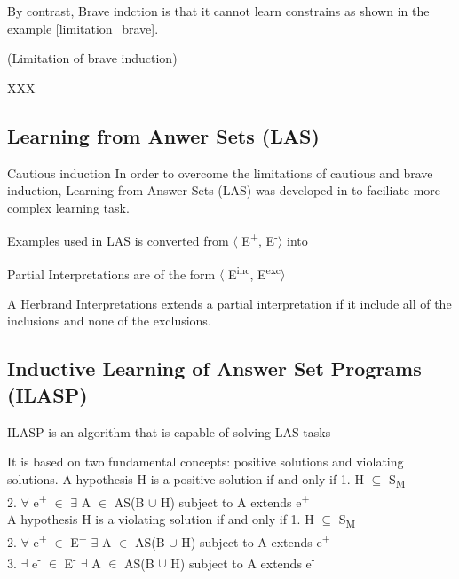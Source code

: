 \documentclass[12pt,twoside]{report}
\begin{document}
By contrast, Brave indction is that it cannot learn constrains as shown in the example \ref{limitation_brave}.

\begin{examp} (Limitation of brave induction)

XXX
\end{examp}
\label{limitation_brave}

\subsection{Learning from Anwer Sets (LAS)}

Cautious induction In order to overcome the limitations of cautious and brave induction,
Learning from Answer Sets (LAS) was developed in \cite{Law2014} to faciliate more complex learning task.

Examples used in LAS is converted from $\langle$ E\textsuperscript{+}, E\textsuperscript{-}$\rangle$ into

Partial Interpretations are of the form $\langle$ E\textsuperscript{inc}, E\textsuperscript{exc}$\rangle$

A Herbrand Interpretations extends a partial interpretation if it include all of the inclusions and none of the exclusions.

\subsection{Inductive Learning of Answer Set Programs (ILASP)}

ILASP is an algorithm that is capable of solving LAS tasks

It is based on two fundamental concepts: positive solutions and violating solutions.
A hypothesis H is a positive solution if and only if
1. H $\subseteq$ S\textsubscript{M} \\
2. $\forall$ e\textsuperscript{+} $\in$ $\exists$ A $\in$ AS(B $\cup$ H) subject to A extends e\textsuperscript{+}\\

A hypothesis H is a violating solution if and only if
1. H $\subseteq$ S\textsubscript{M} \\
2. $\forall$ e\textsuperscript{+} $\in$ E\textsuperscript{+} $\exists$ A $\in$ AS(B $\cup$ H) subject to A extends e\textsuperscript{+}\\
3. $\exists$ e\textsuperscript{-} $\in$ E\textsuperscript{-} $\exists$ A $\in$ AS(B $\cup$ H) subject to A extends e\textsuperscript{-}\\
\end{document}
